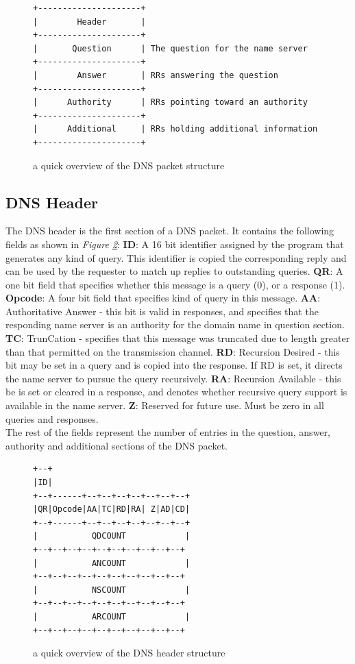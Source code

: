 \documentclass[12pt]{article}
\begin{document}
\begin{figure}[h]
    \begin{lstlisting}
+---------------------+
|        Header       |
+---------------------+
|       Question      | The question for the name server
+---------------------+
|        Answer       | RRs answering the question
+---------------------+
|      Authority      | RRs pointing toward an authority
+---------------------+
|      Additional     | RRs holding additional information
+---------------------+
    \end{lstlisting}
    \caption{a quick overview of the DNS packet structure}
    \label{fig:packet}
\end{figure}


\subsection{DNS Header}
The DNS header is the first section of a DNS packet. It contains the following fields as shown in \textit{Figure \ref{fig:header}}:
\textbf{ID}: A 16 bit identifier assigned by the program that generates any kind of query. This identifier is copied
the corresponding reply and can be used by the requester to match up replies to outstanding queries.
\textbf{QR}: A one bit field that specifies whether this message is a query (0), or a response (1).
\textbf{Opcode}: A four bit field that specifies kind of query in this message.
\textbf{AA}: Authoritative Answer - this bit is valid in responses, and specifies that the responding name server is an authority 
for the domain name in question section.
\textbf{TC}: TrunCation - specifies that this message was truncated due to length greater than that permitted on the transmission channel.
\textbf{RD}: Recursion Desired - this bit may be set in a query and is copied into the response. If RD is set, it directs the name server
to pursue the query recursively.
\textbf{RA}: Recursion Available - this be is set or cleared in a response, and denotes whether recursive query support is available in the name server.
\textbf{Z}: Reserved for future use. Must be zero in all queries and responses.
\\
The rest of the fields represent the number of entries in the question, answer, authority and additional sections of the DNS packet.
\begin{figure}
\begin{lstlisting}
+--+
|ID|
+--+------+--+--+--+--+--+--+--+
|QR|Opcode|AA|TC|RD|RA| Z|AD|CD|
+--+------+--+--+--+--+--+--+--+
|           QDCOUNT            |
+--+--+--+--+--+--+--+--+--+--+
|           ANCOUNT            |
+--+--+--+--+--+--+--+--+--+--+
|           NSCOUNT            |
+--+--+--+--+--+--+--+--+--+--+
|           ARCOUNT            |
+--+--+--+--+--+--+--+--+--+--+
\end{lstlisting}
\caption{a quick overview of the DNS header structure}
\label{fig:header}
\end{figure}
\end{document}
